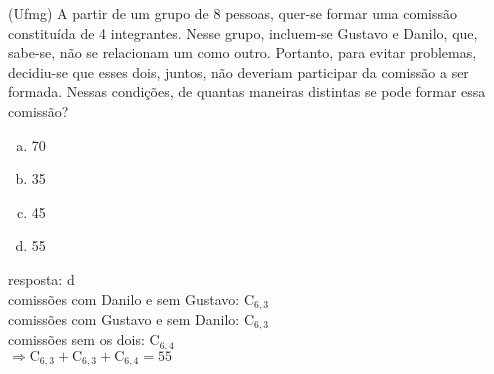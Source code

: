 \begin{ex}
(Ufmg) A partir de um grupo de 8 pessoas, quer-se formar uma comissão constituída de 4 integrantes. Nesse grupo, incluem-se Gustavo e Danilo, que, sabe-se, não se relacionam um como outro. Portanto, para evitar problemas, decidiu-se que esses dois, juntos, não deveriam participar da comissão a ser formada. 
Nessas condições, de quantas maneiras distintas se pode formar essa comissão?
   \begin{enumerate}[(a)]
   \item 70
   \item 35
   \item 45
   \item 55
   \end{enumerate}
     \begin{sol}
      resposta: d \\
      comissões com Danilo e sem Gustavo: $\mathrm{C}_{6,3}$ \\
      comissões com Gustavo e sem Danilo: $\mathrm{C}_{6,3}$ \\
      comissões sem os dois: $\mathrm{C}_{6,4}$\\
      $\Longrightarrow \mathrm{C}_{6,3}+\mathrm{C}_{6,3}+\mathrm{C}_{6,4}= 55$
     \end{sol}
\end{ex}